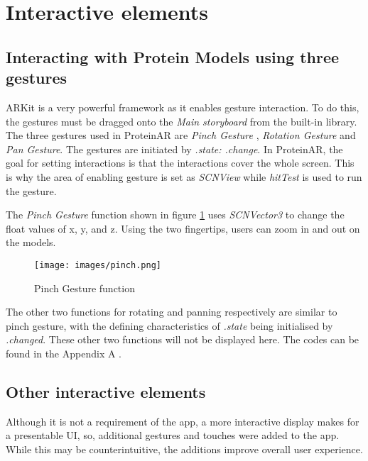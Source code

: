 \section{Interactive elements}
\subsection{Interacting with Protein Models using three gestures}
ARKit is a very powerful framework as it enables gesture interaction. To do this, the gestures must be dragged onto the \emph{Main storyboard} from the built-in library. The three gestures used in ProteinAR are \emph{Pinch Gesture} , \emph{Rotation Gesture} and \emph{Pan Gesture}. The gestures are initiated by \emph{.state: .change}. In ProteinAR, the goal for setting interactions is that the interactions cover the whole screen. This is why the area of enabling gesture is set as \emph{SCNView} while \emph{hitTest} is used to run the gesture. 

The \emph{Pinch Gesture} function shown in figure \ref{fig:pinch} uses \emph{SCNVector3} to change the float values of x, y, and z. Using the two fingertips, users can zoom in and out on the models. 
\begin{figure}[!htp]
	\centering
	\texttt{[image: images/pinch.png]}
	\caption{Pinch Gesture function}
	\label{fig:pinch}
\end{figure}
The other two functions for rotating and panning respectively are similar to pinch gesture, with the defining characteristics of \emph{.state} being initialised by \emph{.changed}. These other two functions will not be displayed here. The codes can be found in the Appendix A . 

\subsection{Other interactive elements}
Although it is not a requirement of the app, a more interactive display makes for a presentable UI, so, additional gestures and touches were added to the app. While this may be counterintuitive, the additions improve overall user experience. 


